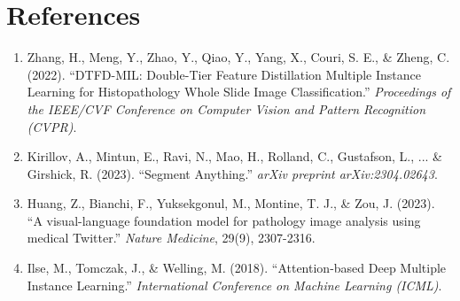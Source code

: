 \documentclass[12pt, a4paper]{article}
\begin{document}
\section{References}
\begin{enumerate}
    \item Zhang, H., Meng, Y., Zhao, Y., Qiao, Y., Yang, X., Couri, S. E., \& Zheng, C. (2022). ``DTFD-MIL: Double-Tier Feature Distillation Multiple Instance Learning for Histopathology Whole Slide Image Classification.'' \textit{Proceedings of the IEEE/CVF Conference on Computer Vision and Pattern Recognition (CVPR)}.
    \item Kirillov, A., Mintun, E., Ravi, N., Mao, H., Rolland, C., Gustafson, L., ... \& Girshick, R. (2023). ``Segment Anything.'' \textit{arXiv preprint arXiv:2304.02643}.
    \item Huang, Z., Bianchi, F., Yuksekgonul, M., Montine, T. J., \& Zou, J. (2023). ``A visual-language foundation model for pathology image analysis using medical Twitter.'' \textit{Nature Medicine}, 29(9), 2307-2316.
    \item Ilse, M., Tomczak, J., \& Welling, M. (2018). ``Attention-based Deep Multiple Instance Learning.'' \textit{International Conference on Machine Learning (ICML)}.
\end{enumerate}
\end{document}

